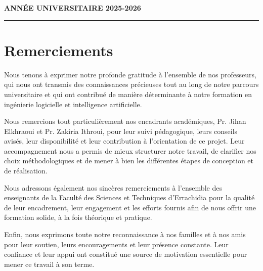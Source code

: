 \documentclass[12pt]{report}
\begin{document}
\begin{titlepage}
    \vfill





    \begin{center}
        \textbf{ANNÉE UNIVERSITAIRE 2025-2026}
    \end{center}

    \vspace{0.3cm}
    \noindent\textcolor{gray}{\rule{\linewidth}{0.8pt}}

\end{titlepage}

\chapter*{Remerciements}

Nous tenons à exprimer notre profonde gratitude à l'ensemble de nos professeurs,
qui nous ont transmis des connaissances précieuses tout au long de notre parcours
universitaire et qui ont contribué de manière déterminante à notre formation en
ingénierie logicielle et intelligence artificielle.

Nous remercions tout particulièrement nos encadrants académiques, Pr. Jihan
Elkhraoui et Pr. Zakiria Ithroui, pour leur suivi pédagogique, leurs conseils
avisés, leur disponibilité et leur contribution à l'orientation de ce projet.
Leur accompagnement nous a permis de mieux structurer notre travail, de clarifier
nos choix méthodologiques et de mener à bien les différentes étapes de conception
et de réalisation.

Nous adressons également nos sincères remerciements à l'ensemble des enseignants
de la Faculté des Sciences et Techniques d'Errachidia pour la qualité de leur
encadrement, leur engagement et les efforts fournis afin de nous offrir une
formation solide, à la fois théorique et pratique.


Enfin, nous exprimons toute notre reconnaissance à nos familles et à nos amis
pour leur soutien, leurs encouragements et leur présence constante. Leur confiance
et leur appui ont constitué une source de motivation essentielle pour mener ce
travail à son terme.

\newpage

\end{document}
